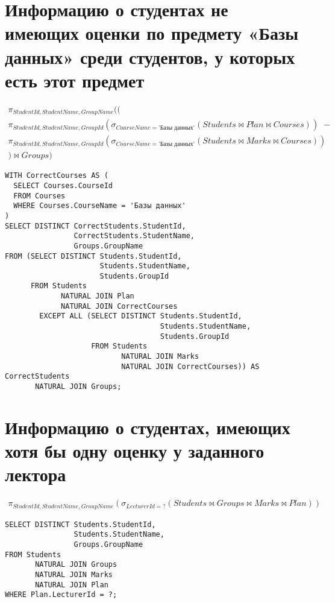 \documentclass{article}
\begin{document}
	\section{Информацию о студентах не имеющих оценки по предмету «Базы данных» среди студентов, у которых есть этот предмет}
	
	\begin{align*}
	\pi_{StudentId, StudentName, GroupName}((\\
		\pi_{StudentId, StudentName, GroupId}(\sigma_{CourseName = \text{'Базы данных'}}(Students \bowtie Plan \bowtie Courses)) && - \\ \pi_{StudentId, StudentName, GroupId}(\sigma_{CourseName = \text{'Базы данных'}}(Students \bowtie Marks \bowtie Courses))\\
	) \bowtie Groups)
	\end{align*}
	
\begin{verbatim}
WITH CorrectCourses AS (
  SELECT Courses.CourseId
  FROM Courses
  WHERE Courses.CourseName = 'Базы данных'
)
SELECT DISTINCT CorrectStudents.StudentId,
                CorrectStudents.StudentName,
                Groups.GroupName
FROM (SELECT DISTINCT Students.StudentId,
                      Students.StudentName,
                      Students.GroupId
      FROM Students
             NATURAL JOIN Plan
             NATURAL JOIN CorrectCourses
        EXCEPT ALL (SELECT DISTINCT Students.StudentId,
                                    Students.StudentName,
                                    Students.GroupId
                    FROM Students
                           NATURAL JOIN Marks
                           NATURAL JOIN CorrectCourses)) AS CorrectStudents
       NATURAL JOIN Groups;
\end{verbatim}

\section{Информацию о студентах, имеющих хотя бы одну оценку у заданного лектора}

	\begin{align*}
	\pi_{StudentId, StudentName, GroupName}(\sigma_{LecturerId = ?}(Students \bowtie Groups \bowtie Marks \bowtie Plan))
	\end{align*}
	
\begin{verbatim}
SELECT DISTINCT Students.StudentId,
                Students.StudentName,
                Groups.GroupName
FROM Students
       NATURAL JOIN Groups
       NATURAL JOIN Marks
       NATURAL JOIN Plan
WHERE Plan.LecturerId = ?;
\end{verbatim}
\end{document}
